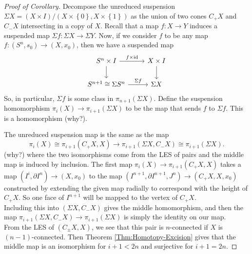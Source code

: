 \documentclass[reqno]{amsart}
\theoremstyle{definition}
\theoremstyle{remark}
\newcommand{\id}{{\mathrm{id}}}
\begin{document}
\begin{proof}[Proof of Corollary]
    Decompose the unreduced suspension
    $\Sigma X = 
    (X \times I) / \left( 
    X \times \left\{ 0 \right\} ,
X \times \left\{ 1 \right\} \right) $ as the
    union of two cones
    $C_+ X$ and $C_{-}X$ intersecting in a 
    copy of $X$.
    Recall that a map
    $f\colon X \to Y$ induces a suspended map
    $\Sigma f \colon \Sigma X \to \Sigma Y$. Now,
    if we consider 
    $f$ to be any map
    $f \colon \left( S^{n},s_0 \right) \to 
    \left( X, x_0 \right) $, then
    we have
    a suspended map
    \begin{equation*}
    \begin{tikzcd}
        S^{n} \times I \ar[r, "f \times \id"]
        \ar[d] & X \times I \ar[d] \\
        S^{n+1} \cong \Sigma S^{n} \ar[r, "\Sigma f"] & \Sigma X
    \end{tikzcd}
    \end{equation*}
    So, in particular,
    $\Sigma f$ is some class
    in $\pi_{n+1} \left( \Sigma X \right) $.
    Define the suspension homomorphism
    $\pi_i (X) \to \pi_{i+1}\left( \Sigma X \right) $ 
    to be the map that sends
    $f$ to $\Sigma f$. This is a homomorphism (why?).

    The unreduced suspension map is the same
    as the map
    \[
    \pi_i (X) \cong
    \pi_{i+1} \left( C_+ X, X \right) 
    \to \pi_{i+1} (\Sigma X, C_{-}X) \cong
    \pi_{i+1} \left( \Sigma X \right) .
    \] 
    (why?) where the two isomorphisms come
    from the LES of pairs and the middle
    map is induced by inclusion.
    The first map
    $\pi_i (X) \to \pi_{i+1}(C_+ X, X)$ 
    takes a map
    $\left( I^{i}, \partial I^{n} \right) 
    \to \left( X, x_0 \right) $ 
    to the map
    $\left( I^{n+1}, \partial I^{n+1},
    J^{n}\right) \to \left( C_+ X, X, x_0 \right) $
    constructed by extending
    the given map radially to correspond with the
    height of $C_{+}X$. So one face of
    $I^{n+1}$ will be mapped to the vertex of
    $C_{+}X$.\\

    Including this into
    $\left( \Sigma X, C_{-}X \right) $ gives
    the middle homomorphism, and
    then the map
    $\pi_{i+1} \left( \Sigma X, C_{-}X \right) \to 
    \pi_{i+1}(\Sigma X)$ is simply the identity on
    our map. \\
    From the LES of $\left( C_{\pm }X, X \right) $, we
    see that this pair is $n$-connected
    if $X$ is $(n-1)$-connected. Then
    Theorem \ref{Thm:Homotopy-Excision} gives
    that the middle map is an isomorphism
    for $i+1 < 2n$ and surjective for
    $i+1 = 2n$.

\end{proof}
\end{document}
